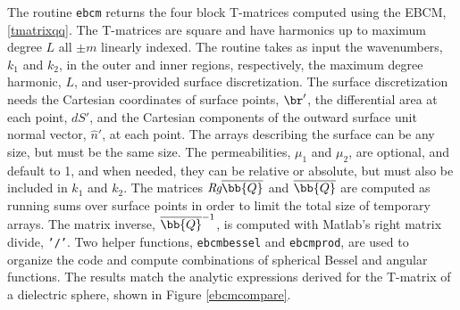 The routine \texttt{ebcm} returns the four block T-matrices computed using the EBCM, \eqref{tmatrixqq}. The T-matrices are square and have harmonics up to maximum degree $L$ all $\pm m$ linearly indexed. The routine takes as input the wavenumbers, $k_1$ and $k_2$, in the outer and inner regions, respectively, the maximum degree harmonic, $L$, and user-provided surface discretization. The surface discretization needs the Cartesian coordinates of surface points, $\br'$, the differential area at each point, $dS'$, and the Cartesian components of the outward surface unit normal vector, $\hat{n}'$, at each point. The arrays describing the surface can be any size, but must be the same size. The permeabilities, $\mu_1$ and $\mu_2$, are optional, and default to 1, and when needed, they can be relative or absolute, but must also be included in $k_1$ and $k_2$. The matrices $\textit{Rg}\overline{\bb{Q}}$ and $\overline{\bb{Q}}$ are computed as running sums over surface points in order to limit the total size of temporary arrays. The matrix inverse, $\overline{\bb{Q}}^{-1}$, is computed with Matlab's right matrix divide, \texttt{'/'}.  Two helper functions, \texttt{ebcmbessel} and \texttt{ebcmprod}, are used to organize the code and compute combinations of spherical Bessel and angular functions. The results match the analytic expressions derived for the T-matrix of a dielectric sphere, shown in Figure \ref{ebcmcompare}. 


{\footnotesize
{}
}


